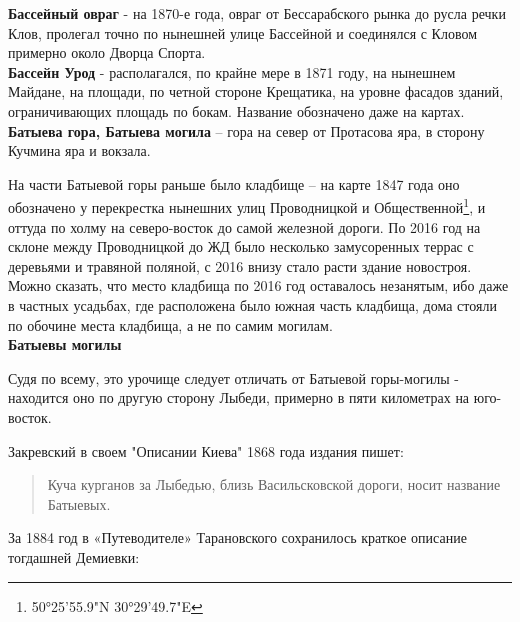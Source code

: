 \textbf{Бассейный овраг} - на 1870-е года, овраг от Бессарабского рынка до русла речки Клов, пролегал точно по нынешней улице Бассейной и соединялся с Кловом примерно около Дворца Спорта.\\


\textbf{Бассейн Урод} - располагался, по крайне мере в 1871 году, на нынешнем Майдане, на площади, по четной стороне Крещатика, на уровне фасадов зданий, ограничивающих площадь по бокам. Название обозначено даже на картах.\\



\textbf{Батыева гора, Батыева могила} –  гора на север от Протасова яра, в сторону Кучмина яра и вокзала.

На части Батыевой горы раньше было кладбище – на карте 1847 года оно обозначено у перекрестка нынешних улиц Проводницкой и Общественной\footnote{50°25'55.9"N 30°29'49.7"E}, и оттуда по холму на северо-восток до самой железной дороги. По 2016 год на склоне между Проводницкой до ЖД было несколько замусоренных террас с деревьями и травяной поляной, с 2016 внизу стало расти здание новостроя. Можно сказать, что место кладбища по 2016 год оставалось незанятым, ибо даже в частных усадьбах, где расположена было южная часть кладбища, дома стояли по обочине места кладбища, а не по самим могилам.\\


\textbf{Батыевы могилы}

Судя по всему, это урочище следует отличать от Батыевой горы-могилы - находится оно по другую сторону Лыбеди, примерно в пяти километрах на юго-восток.

Закревский в своем "Описании Киева" 1868 года издания пишет:

\begin{quotation}
Куча курганов за Лыбедью, близь Васильсковской дороги, носит название Батыевых.
\end{quotation}


За 1884 год в «Путеводителе» Тарановского сохранилось краткое описание тогдашней Демиевки:

